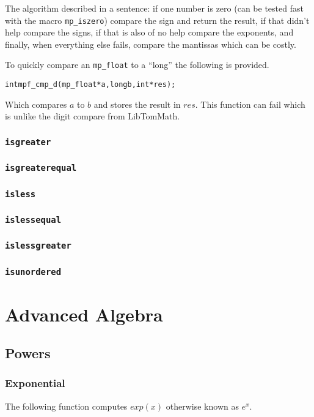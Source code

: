 \documentclass[a4paper]{book}
\theoremstyle{definition}
\theoremstyle{remark}
\begin{document}
The algorithm described in a sentence: if one number is zero (can be tested fast with the macro {\texttt{mp\_iszero}}) compare the sign and return the result, if that didn't help compare the signs, if that is also of no help compare the exponents, and finally, when everything else fails, compare the mantissas which can be costly.

To quickly compare an {\texttt{mp\_float}} to a ``long'' the following is provided.

\begin{alltt}
int  mpf_cmp_d(mp_float *a, long b, int *res);
\end{alltt}

Which compares $a$ to $b$ and stores the result in $res$.  This function can fail which is unlike the digit compare from LibTomMath.

\subsection{{\texttt{isgreater}}}
\subsection{{\texttt{isgreaterequal}}}
\subsection{{\texttt{isless}}}
\subsection{{\texttt{islessequal}}}
\subsection{{\texttt{islessgreater}}}
\subsection{{\texttt{isunordered}}}



\chapter{Advanced Algebra}
\section{Powers}
\subsection{Exponential}
The following function computes $exp(x)$ otherwise known as $e^x$.
\end{document}
